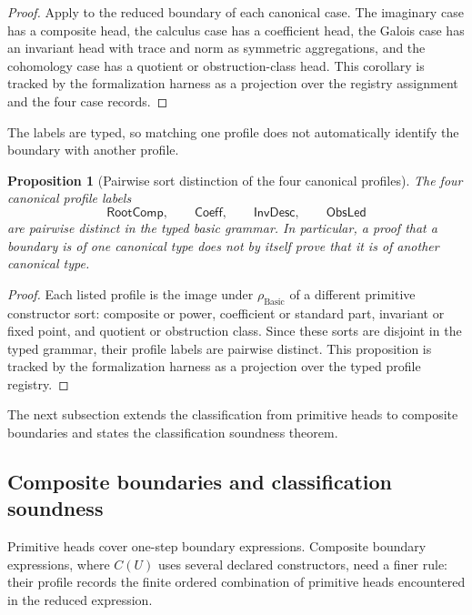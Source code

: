 \documentclass[11pt]{article}
\newcommand{\RootComp}{\mathsf{RootComp}}
\newcommand{\Coeff}{\mathsf{Coeff}}
\newcommand{\InvDesc}{\mathsf{InvDesc}}
\newcommand{\ObsLed}{\mathsf{ObsLed}}
\newcommand{\Basic}{\operatorname{Basic}}
\newtheorem{proposition}[theorem]{Proposition}
\theoremstyle{definition}
\begin{document}
\begin{proof}
Apply  to the reduced boundary of
each canonical case.  The imaginary case has a composite head, the calculus case
has a coefficient head, the Galois case has an invariant head with trace and norm
as symmetric aggregations, and the cohomology case has a quotient or
obstruction-class head.  This corollary is tracked by the formalization harness
as a projection over the registry assignment and the four case records.
\end{proof}

The labels are typed, so matching one profile does not automatically identify the
boundary with another profile.

\begin{proposition}[Pairwise sort distinction of the four canonical profiles]
\label{prop:sau-pairwise-profile-distinction}
The four canonical profile labels
\[
\RootComp,
\qquad \Coeff,
\qquad \InvDesc,
\qquad \ObsLed
\]
are pairwise distinct in the typed basic grammar.  In particular, a proof that a boundary is of one canonical type does not by itself prove that it is of another canonical type.
\end{proposition}

\begin{proof}
Each listed profile is the image under \(\rho_{\Basic}\) of a different
primitive constructor sort: composite or power, coefficient or standard part,
invariant or fixed point, and quotient or obstruction class.  Since these sorts
are disjoint in the typed grammar, their profile labels are pairwise distinct.
This proposition is tracked by the formalization harness as a projection over
the typed profile registry.
\end{proof}

The next subsection extends the classification from primitive heads to composite
boundaries and states the classification soundness theorem.

\subsection{Composite boundaries and classification soundness}
\label{subsec:classification-composite-soundness}

Primitive heads cover one-step boundary expressions.  Composite boundary
expressions, where \(C(U)\) uses several declared constructors, need a finer
rule: their profile records the finite ordered combination of primitive heads
encountered in the reduced expression.
\end{document}
